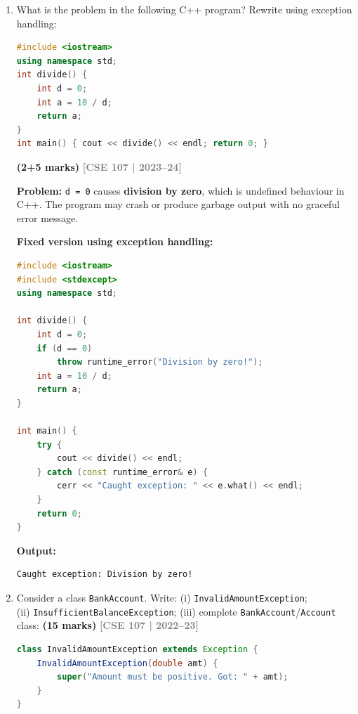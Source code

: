 \documentclass[12pt,a3paper]{article}
\newcommand{\yr}[1]{\hfill\textcolor{gray}{\small\textbf{[#1]}}}
\newcommand{\mk}[1]{\textcolor{orange!70!black}{\small\textbf{(#1 marks)}}}
\begin{document}
\begin{enumerate}
\item What is the problem in the following C++ program? Rewrite using exception handling:
\begin{lstlisting}[language=C++]
#include <iostream>
using namespace std;
int divide() {
    int d = 0;
    int a = 10 / d;
    return a;
}
int main() { cout << divide() << endl; return 0; }
\end{lstlisting}
\mk{2+5}
\yr{CSE 107 | 2023--24}

\begin{tcolorbox}[enhanced,breakable,ansbox,
  colback=cE!4,colframe=cE,boxrule=0.8pt,arc=5pt,
  title={\textbf{Answer --- Division by Zero: Problem and Fix with Exception Handling}},
  fonttitle=\bfseries\color{white},colbacktitle=cE]

\textbf{Problem:} \texttt{d = 0} causes \textbf{division by zero},
which is undefined behaviour in C++. The program may crash or produce
garbage output with no graceful error message.

\textbf{Fixed version using exception handling:}
\begin{lstlisting}[language=C++]
#include <iostream>
#include <stdexcept>
using namespace std;

int divide() {
    int d = 0;
    if (d == 0)
        throw runtime_error("Division by zero!");
    int a = 10 / d;
    return a;
}

int main() {
    try {
        cout << divide() << endl;
    } catch (const runtime_error& e) {
        cerr << "Caught exception: " << e.what() << endl;
    }
    return 0;
}
\end{lstlisting}
\textbf{Output:}
\begin{verbatim}
Caught exception: Division by zero!
\end{verbatim}
\end{tcolorbox}




\item Consider a class \texttt{BankAccount}. Write: (i) \texttt{InvalidAmountException};\\ (ii) \texttt{InsufficientBalanceException}; (iii) complete \texttt{BankAccount}/\texttt{Account} class: \mk{15}
\yr{CSE 107 | 2022--23}

\begin{tcolorbox}[enhanced,breakable,ansbox,
  colback=cE!4,colframe=cE,boxrule=0.8pt,arc=5pt,
  title={\textbf{Answer --- BankAccount with InvalidAmount and InsufficientBalance Exceptions}},
  fonttitle=\bfseries\color{white},colbacktitle=cE]
\begin{lstlisting}[language=Java]
class InvalidAmountException extends Exception {
    InvalidAmountException(double amt) {
        super("Amount must be positive. Got: " + amt);
    }
}


\end{lstlisting}
\end{tcolorbox}
\end{enumerate}
\end{document}
